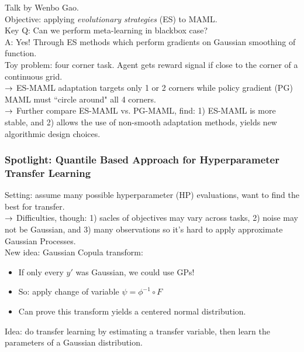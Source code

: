 Talk by Wenbo Gao. \\

Objective: applying {\it evolutionary strategies} (ES) to MAML. \\

Key Q: Can we perform meta-learning in blackbox case? \\

A: Yes! Through ES methods which perform gradients on Gaussian smoothing of function. \\

Toy problem: four corner task. Agent gets reward signal if close to the corner of a continuous grid. \\

$\rightarrow$ ES-MAML adaptation targets only 1 or 2 corners while policy gradient (PG) MAML must ``circle around" all 4 corners. \\

$\rightarrow$ Further compare ES-MAML vs. PG-MAML, find: 1) ES-MAML is more stable, and 2) allows the use of non-smooth adaptation methods, yields new algorithmic design choices.


\subsubsection{Spotlight: Quantile Based Approach for Hyperparameter Transfer Learning}

Setting: assume many possible hyperparameter (HP) evaluations, want to find the best for transfer. \\

$\rightarrow$ Difficulties, though: 1) sacles of objectives may vary across tasks, 2) noise may not be Gaussian, and 3) many observations so it's hard to apply approximate Gaussian Processes. \\

New idea: Gaussian Copula transform:
\begin{itemize}
    \item If only every $y'$ was Gaussian, we could use GPs!
    \item So: apply change of variable $\psi = \phi^{-1} \circ F$
    \item Can prove this transform yields a centered normal distribution.
\end{itemize}

Idea: do transfer learning by estimating a transfer variable, then learn the parameters of a Gaussian distribution. \\

